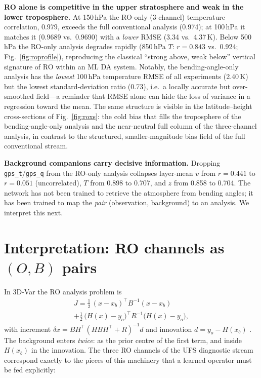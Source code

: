 \documentclass[twocolumn,11pt]{article}
\begin{document}
\textbf{RO alone is competitive in the upper stratosphere and weak in
the lower troposphere.} At 150\,hPa the RO-only (3-channel)
temperature correlation, 0.979, exceeds the full conventional
analysis (0.974); at 100\,hPa it matches it (0.9689 vs.\ 0.9690)
with a \emph{lower} RMSE (3.34 vs.\ 4.37\,K). Below 500\,hPa the
RO-only analysis degrades rapidly (850\,hPa $T$: $r=0.843$ vs.\
0.924; Fig.~\ref{fig:roprofile}), reproducing the classical
``strong above, weak below'' vertical signature of RO
\citep{anthes2008cosmic,healy2006assimilation} within an ML DA
system. Notably, the bending-angle-only analysis has the \emph{lowest}
100\,hPa temperature RMSE of all experiments (2.40\,K) but the lowest
standard-deviation ratio (0.73), i.e.\ a locally accurate but
over-smoothed field---a reminder that RMSE alone can hide the loss of
variance in a regression toward the mean. The same structure is
visible in the latitude--height cross-sections of
Fig.~\ref{fig:roxs}: the cold bias that fills the troposphere of the
bending-angle-only analysis and the near-neutral full column of the
three-channel analysis, in contrast to the structured, smaller-magnitude
bias field of the full conventional stream.

\textbf{Background companions carry decisive information.} Dropping
\texttt{gps\_t}/\texttt{gps\_q} from the RO-only analysis collapses
layer-mean $v$ from $r=0.441$ to $r=0.051$ (uncorrelated), $T$ from
0.898 to 0.707, and $z$ from 0.858 to 0.704. The network has not been
trained to retrieve the atmosphere from bending angles; it has been
trained to map the \emph{pair} (observation, background) to an
analysis. We interpret this next.

\section{Interpretation: RO channels as $(O, B)$ pairs}\label{sec:interpretation}

In 3D-Var the RO analysis problem is
\begin{multline}\label{eq:3dvar}
J = \tfrac{1}{2}\,(x - x_b)^{\top} B^{-1}(x - x_b)\\
  + \tfrac{1}{2}\,\bigl(H(x) - y_o\bigr)^{\top} R^{-1}
      \bigl(H(x) - y_o\bigr),
\end{multline}
with increment $\delta x = BH^{\top}(HBH^{\top}+R)^{-1}d$ and
innovation $d = y_o - H(x_b)$ \citep{lorenc1986analysis,
daley1991atmospheric, courtier1994strategy}. The background enters
\emph{twice}: as the prior centre of the first term, and inside
$H(x_b)$ in the innovation. The three RO channels of the UFS
diagnostic stream correspond exactly to the pieces of this machinery
that a learned operator must be fed explicitly:
\end{document}
